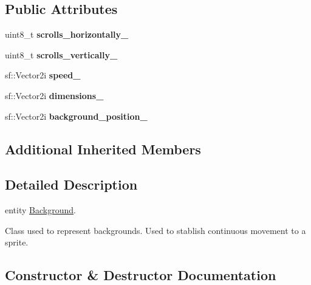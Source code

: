 \subsection*{Public Attributes}
\begin{DoxyCompactItemize}
\item 
\mbox{\label{class_background_a9150d8924dc8e74ff9852d33cc0b574f}} 
uint8\+\_\+t {\bfseries scrolls\+\_\+horizontally\+\_\+}
\item 
\mbox{\label{class_background_aa26c61f1bbed1d8a8625b51bc3cc16dd}} 
uint8\+\_\+t {\bfseries scrolls\+\_\+vertically\+\_\+}
\item 
\mbox{\label{class_background_a4402837678f3b72ac1f5803c97dfba28}} 
sf\+::\+Vector2i {\bfseries speed\+\_\+}
\item 
\mbox{\label{class_background_a515f93f6c513ec0519c02fa30c8bc5fa}} 
sf\+::\+Vector2i {\bfseries dimensions\+\_\+}
\item 
\mbox{\label{class_background_abf90fe1fcc93375f86aee37a1dddbe37}} 
sf\+::\+Vector2i {\bfseries background\+\_\+position\+\_\+}
\end{DoxyCompactItemize}
\subsection*{Additional Inherited Members}


\subsection{Detailed Description}
entity \hyperlink{class_background}{Background}.

Class used to represent backgrounds. Used to stablish continuous movement to a sprite. 

\subsection{Constructor \& Destructor Documentation}
\mbox{\label{class_background_a36754df1deb720393217ade59da41557}} 

